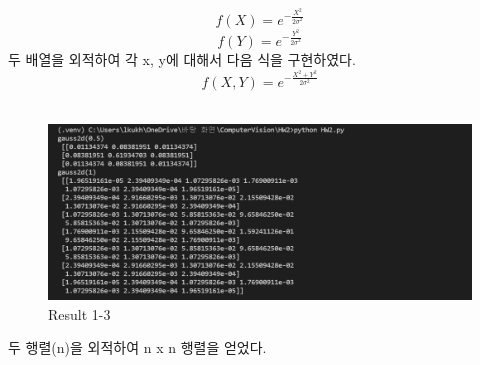 \documentclass[]{report}
\begin{document}
\[ f(X) = e^{-\frac{X^2}{2\sigma^2}} \] 
\[ f(Y) = e^{-\frac{Y^2}{2\sigma^2}} \] 
두 배열을 외적하여 각 x, y에 대해서 다음 식을 구현하였다.
\[ f(X,Y) = e^{-\frac{X^2 + Y^2}{2\sigma^2}} \] \\

\begin{figure}[ht!]
	\centering
	\includegraphics[width=1\textwidth]{image/result_1-3.png}
	\caption{Result 1-3}
	\label{result1_3}
\end{figure}


두 행렬(n)을 외적하여 n x n 행렬을 얻었다. \\
\end{document}
